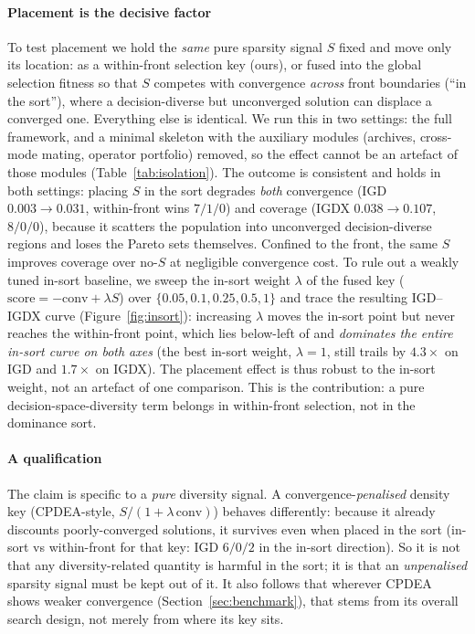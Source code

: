 \paragraph{Placement is the decisive factor} To test placement we hold the
\emph{same} pure sparsity signal $S$ fixed and move only its location: as a within-front
selection key (ours), or fused into the global selection fitness so that $S$ competes with
convergence \emph{across} front boundaries (``in the sort''), where a decision-diverse but
unconverged solution can displace a converged one. Everything else is identical. We run this in
two settings: the full framework, and a minimal skeleton with the auxiliary modules (archives,
cross-mode mating, operator portfolio) removed, so the effect cannot be an artefact of those
modules (Table~\ref{tab:isolation}). The outcome is consistent and holds in both settings:
placing $S$ in the sort degrades \emph{both} convergence (IGD $0.003\!\to\!0.031$, within-front
wins $7/1/0$) and coverage (IGDX $0.038\!\to\!0.107$, $8/0/0$), because it scatters the
population into unconverged decision-diverse regions and loses the Pareto sets themselves.
Confined to the front, the same $S$ improves coverage over no-$S$ at negligible
convergence cost. To rule out a weakly tuned in-sort baseline, we sweep the in-sort
weight $\lambda$ of the fused key ($\mathrm{score}={-}\mathrm{conv}+\lambda S$) over
$\{0.05,0.1,0.25,0.5,1\}$ and trace the resulting IGD--IGDX curve (Figure~\ref{fig:insort}):
increasing $\lambda$ moves the in-sort point but never reaches the within-front point, which lies
below-left of and \emph{dominates the entire in-sort curve on both axes} (the best in-sort weight,
$\lambda{=}1$, still trails by $4.3\times$ on IGD and $1.7\times$ on IGDX). The placement effect is
thus robust to the in-sort weight, not an artefact of one comparison. This is the contribution: a
pure decision-space-diversity term belongs in within-front selection, not in the dominance sort.

\paragraph{A qualification} The claim is specific to a \emph{pure} diversity signal. A
convergence-\emph{penalised} density key (CPDEA-style, $S/(1{+}\lambda\,\mathrm{conv})$) behaves
differently: because it already discounts poorly-converged solutions, it survives even when placed
in the sort (in-sort vs within-front for that key: IGD $6/0/2$ in the in-sort direction). So it is
not that any diversity-related quantity is harmful in the sort; it is that an \emph{unpenalised}
sparsity signal must be kept out of it. It also follows that wherever CPDEA shows weaker
convergence (Section~\ref{sec:benchmark}), that stems from its overall search design, not merely
from where its key sits.

